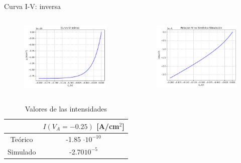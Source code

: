 \documentclass[aspectratio=169,xcolor=dvipsnames]{beamer}
\begin{document}
\begin{frame}{Curva I-V: inversa}
    \begin{columns}
        \begin{column}{0.5\textwidth}
            \begin{figure}
                \includegraphics[width=0.90\linewidth]{Teorico/Intensidades-Inversa.pdf}
            \end{figure}
        \end{column}
        \begin{column}{0.5\textwidth}
            \begin{figure}
                \includegraphics[width=0.90\linewidth]{Inversa/Intensidades-Inversa.pdf}
            \end{figure}
        \end{column}
        \end{columns}
        \begin{table}
            \caption{Valores de las intensidades}
            \begin{tabular}{c|c}
                & $I(V_A=-0.25)$ \tiny{[A/cm$^2$]} \\ \hline
                Teórico &  -1.85 $\cdot 10^{-10}$  \\
                Simulado & -2.70$10^{-5}$  
            \end{tabular}
        \end{table}
\end{frame}
\end{document}

